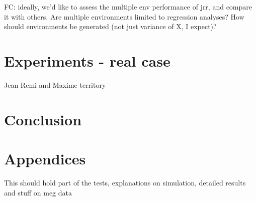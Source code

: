 \documentclass{article}
\begin{document}
FC: ideally, we'd like to assess the multiple env performance of jrr, and compare it with others.
%
Are multiple environments limited to regression analyses? How should environments be generated (not just variance of X, I expect)?

\section{Experiments - real case}
Jean Remi and Maxime territory

\section{Conclusion}

\clearpage
\newpage




\section{Appendices}

This should hold part of the tests, explanations on simulation, detailed results and stuff on meg data
\end{document}
